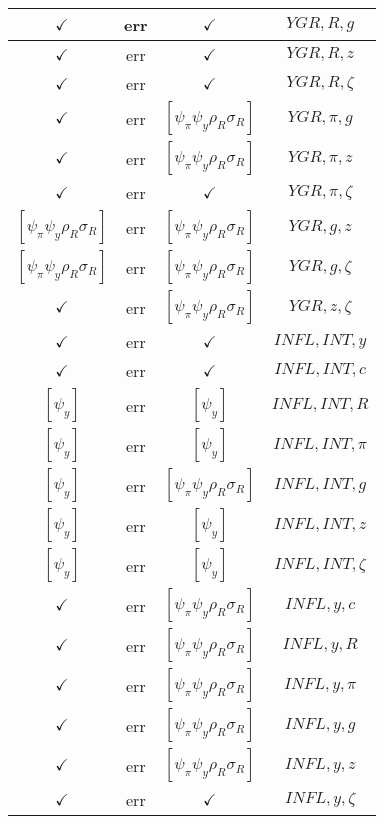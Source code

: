 \documentclass[a4paper,10pt]{article}
\begin{document}
\begin{longtable}{|c|c|c|c|}
\hline
$\checkmark$ & err & $\checkmark$ & ${YGR},{R},{g}$ \\
\hline
$\checkmark$ & err & $\checkmark$ & ${YGR},{R},{z}$ \\
\hline
$\checkmark$ & err & $\checkmark$ & ${YGR},{R},{\zeta}$ \\
\hline
$\checkmark$ & err & $[\psi_\pi \psi_y \rho_R \sigma_R ]$ & ${YGR},{\pi},{g}$ \\
\hline
$\checkmark$ & err & $[\psi_\pi \psi_y \rho_R \sigma_R ]$ & ${YGR},{\pi},{z}$ \\
\hline
$\checkmark$ & err & $\checkmark$ & ${YGR},{\pi},{\zeta}$ \\
\hline
$[\psi_\pi \psi_y \rho_R \sigma_R ]$ & err & $[\psi_\pi \psi_y \rho_R \sigma_R ]$ & ${YGR},{g},{z}$ \\
\hline
$[\psi_\pi \psi_y \rho_R \sigma_R ]$ & err & $[\psi_\pi \psi_y \rho_R \sigma_R ]$ & ${YGR},{g},{\zeta}$ \\
\hline
$\checkmark$ & err & $[\psi_\pi \psi_y \rho_R \sigma_R ]$ & ${YGR},{z},{\zeta}$ \\
\hline
$\checkmark$ & err & $\checkmark$ & ${INFL},{INT},{y}$ \\
\hline
$\checkmark$ & err & $\checkmark$ & ${INFL},{INT},{c}$ \\
\hline
$[\psi_y ]$ & err & $[\psi_y ]$ & ${INFL},{INT},{R}$ \\
\hline
$[\psi_y ]$ & err & $[\psi_y ]$ & ${INFL},{INT},{\pi}$ \\
\hline
$[\psi_y ]$ & err & $[\psi_\pi \psi_y \rho_R \sigma_R ]$ & ${INFL},{INT},{g}$ \\
\hline
$[\psi_y ]$ & err & $[\psi_y ]$ & ${INFL},{INT},{z}$ \\
\hline
$[\psi_y ]$ & err & $[\psi_y ]$ & ${INFL},{INT},{\zeta}$ \\
\hline
$\checkmark$ & err & $[\psi_\pi \psi_y \rho_R \sigma_R ]$ & ${INFL},{y},{c}$ \\
\hline
$\checkmark$ & err & $[\psi_\pi \psi_y \rho_R \sigma_R ]$ & ${INFL},{y},{R}$ \\
\hline
$\checkmark$ & err & $[\psi_\pi \psi_y \rho_R \sigma_R ]$ & ${INFL},{y},{\pi}$ \\
\hline
$\checkmark$ & err & $[\psi_\pi \psi_y \rho_R \sigma_R ]$ & ${INFL},{y},{g}$ \\
\hline
$\checkmark$ & err & $[\psi_\pi \psi_y \rho_R \sigma_R ]$ & ${INFL},{y},{z}$ \\
\hline
$\checkmark$ & err & $\checkmark$ & ${INFL},{y},{\zeta}$ \\

\end{longtable}
\end{document}
